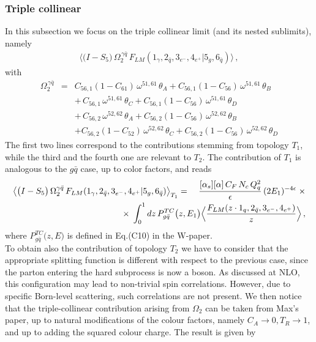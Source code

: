 \documentclass[12pt,a4paper]{article}
\newcommand{\nn}{\nonumber}
\newcommand{\eps}{\epsilon}
\newcommand{\beq}{\begin{eqnarray}}
\newcommand{\eeq}{\end{eqnarray}}
\newcommand{\barq}{{\bar{q}}}
\begin{document}
 \subsubsection{Triple collinear}
In this subsection we focus on the triple collinear limit (and its nested
sublimits), namely
\beq
\big\langle \big( I -S_{5}\big) \,  \Omega^{\, \gamma \bar{q}}_2 \, F_{LM}(1_\gamma,2_{\bar{q}},3_{e^-},4_{e^+} |5_g, 6_{\bar{q}})\big\rangle \, ,
\eeq
with
 \beq
  \Omega^{\, \gamma\bar{q}}_2
&=&
C_{56, 1} (1-C_{61})  \, 
\omega^{51,61}  \, \theta_A 
+ 
C_{56, 1} (1-C_{56}) \,  \omega^{51,61} \, \theta_B
\nn \\
&& 
+ \, 
 C_{56, 1}  \,  \omega^{51,61} \, \theta_C
+
 C_{56, 1} (1-C_{56})  \,  \omega^{51,61} \, \theta_D 
 \nn \\
 && 
 + \, 
 C_{56,2} \,  \omega^{52,62} \, \theta_A 
 +
C_{56,2} (1-C_{56})  \,  \omega^{52,62} \, \theta_B 
\nn \\
&&
+
 C_{56,2} (1-C_{52}) \,  \omega^{52,62} \, \theta_C
 +
  C_{56,2} (1-C_{56})  \,  \omega^{52,62} \, \theta_D
  \eeq
The first two lines correspond to the contributions stemming from 
topology $T_1$, while the third and the fourth one are relevant to $T_2$.
The contribution of $T_1$ is analogous to the $g\barq$ case, 
up to color factors, and reads
\beq
\big\langle \big( I -S_{5} \big) \,  \Omega^{\gamma\bar{q}}_2 \, 
F_{LM}(1_\gamma,2_{\bar{q}},3_{e^-},4_{e^+} |5_g, 6_{\bar{q}})\big\rangle
_{T_1}
&=&
\frac{ [\alpha_s] [\alpha] \, C_F \, N_c  \, Q_q^2}{\eps} \, 
 (2 E_1)^{-4\eps} \; \times
 \nn \\
 && \hspace{-3cm }\times \; 
\int_0^1 dz \, P_{g\bar{q}}^{TC}\big(z,E_1\big)
\Big\langle
\frac{F_{LM}(z\cdot 1_q,2_{\bar{q}},3_{e^-},4_{e^+})}{z}
\Big\rangle
\, ,
\eeq
where $P_{g\bar{q}}^{TC}\big(z,E\big)$ is defined in Eq.(C10) 
in the W-paper. \\
To obtain also the contribution of topology $T_2$ we have to
consider that the appropriate splitting function is different
with respect to the previous case, since the parton entering
the hard subprocess is now a boson. As discussed at NLO, 
this configuration may lead to non-trivial spin correlations.
However, due to specific Born-level scattering, such
correlations are not present.
We then notice that the triple-collinear contribution 
arising from $\Omega_2$ can be taken from Max's paper, up to 
natural modifications of the colour factors, namely $C_A \rightarrow 0, T_R \rightarrow 1$, and up to adding the squared colour charge.
The result is given by
\end{document}
